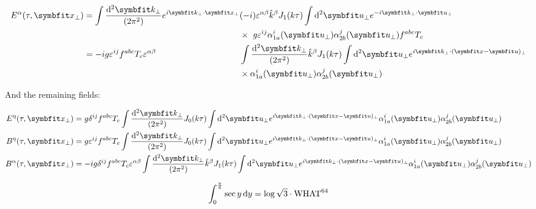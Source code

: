 \begin{equation}
	\begin{alignedat}{2}
		E^\alpha (\tau,\mathbf{x}_\perp) & =  \int \frac{\diff^2 \mathbf{k}_\perp}{(2\pi^2)} e^{i \mathbf{k}_\perp \cdot \mathbf{x}_\perp} & & (-i)   \varepsilon^{\alpha \beta} \hat{k}^\beta J_1 (k \tau)  \int \diff^2 \mathbf{u}_\perp e^{-i \mathbf{k}_\perp \cdot \mathbf{u}_\perp} \\
		& ~ & & \times ~ g \varepsilon^{ij} \alpha^i_{1a} (\mathbf{u}_\perp) \alpha^j_{2b}(\mathbf{u}_\perp) f^{abc} T_c \\
		& = -ig \varepsilon^{ij} f^{abc} T_c \varepsilon^{\alpha \beta} & & \int  \frac{\diff^2 \mathbf{k}_\perp}{(2\pi^2)} \hat{k}^\beta J_1 (k \tau) \int \diff^2 \mathbf{u}_\perp e^{i \mathbf{k}_\perp \cdot (\mathbf{x} - \mathbf{u})_\perp}  \\
		& ~ & & \times \alpha^i_{1a} (\mathbf{u}_\perp) \alpha^j_{2b}(\mathbf{u}_\perp)
	\end{alignedat}
\end{equation}

And the remaining fields:

\begin{align}
	E^\eta (\tau,\mathbf{x}_\perp) & = g \delta^{ij} f^{abc} T_c \int  \frac{\diff^2 \mathbf{k}_\perp}{(2\pi^2)} J_0 (k \tau) \int \diff^2 \mathbf{u}_\perp e^{i \mathbf{k}_\perp \cdot (\mathbf{x} - \mathbf{u})_\perp} \alpha^i_{1a} (\mathbf{u}_\perp) \alpha^j_{2b}(\mathbf{u}_\perp) \\
	B^\eta (\tau,\mathbf{x}_\perp) & = g \varepsilon^{ij} f^{abc} T_c \int  \frac{\diff^2 \mathbf{k}_\perp}{(2\pi^2)} J_0 (k \tau) \int \diff^2 \mathbf{u}_\perp e^{i \mathbf{k}_\perp \cdot (\mathbf{x} - \mathbf{u})_\perp} \alpha^i_{1a} (\mathbf{u}_\perp) \alpha^j_{2b}(\mathbf{u}_\perp) \\
	B^\alpha (\tau,\mathbf{x}_\perp) & = -ig \delta^{ij} f^{abc} T_c \varepsilon^{\alpha \beta} \int  \frac{\diff^2 \mathbf{k}_\perp}{(2\pi^2)} \hat{k}^\beta J_1 (k \tau) \int \diff^2 \mathbf{u}_\perp e^{i \mathbf{k}_\perp \cdot (\mathbf{x} - \mathbf{u})_\perp} \alpha^i_{1a} (\mathbf{u}_\perp) \alpha^j_{2b}(\mathbf{u}_\perp)
\end{align}

$$ \int_0^{\frac{\pi}{6}} \sec{y} \mathop{}\!\mathrm{d} y = \log \sqrt{3} \cdot \text{WHAT}^{64}$$
